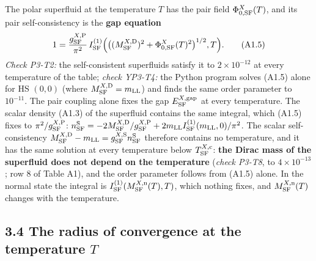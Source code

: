 \documentclass[
  10pt,
]{article}
\begin{document}
The polar superfluid at the temperature \(T\) has the pair field
\(\Phi^X_{0,{\rm SF}}(T)\), and its pair self-consistency is the
\textbf{gap equation}
\[1=\frac{g^{X,{\rm P}}_{\rm SF}}{\pi^2}\,I^{(1)}_{\rm SF}\Big(\big((M^{X,{\rm D}}_{\rm SF})^2+\Phi^X_{0,{\rm SF}}(T)^2\big)^{1/2},T\Big).\tag{A1.5}\]
\emph{Check P3-T2:} the self-consistent superfluids satisfy it to
\(2\times10^{-12}\) at every temperature of the table; \emph{check
YP3-T4:} the Python program solves (A1.5) alone for HS \((0,0)\) (where
\(M^{X,{\rm D}}_{\rm SF}=m_{\rm LL}\)) and finds the same order
parameter to \(10^{-11}\). The pair coupling alone fixes the gap
\(E^{X,{\rm gap}}_{\rm SF}\) at every temperature. The scalar density
(A1.3) of the superfluid contains the same integral, which (A1.5) fixes
to \(\pi^2/g^{X,{\rm P}}_{\rm SF}\):
\(n^{\rm S}_{\rm SF}=-2M^{X,{\rm D}}_{\rm SF}/g^{X,{\rm P}}_{\rm SF}+2m_{\rm LL}I^{(1)}_{\rm SF}(m_{\rm LL},0)/\pi^2\).
The scalar self-consistency
\(M^{X,{\rm D}}_{\rm SF}-m_{\rm LL}=g^{X,{\rm S}}_{\rm SF}n^{\rm S}_{\rm SF}\)
therefore contains no temperature, and it has the same solution at every
temperature below \(T^{X,{\rm c}}_{\rm SF}\): \textbf{the Dirac mass of
the superfluid does not depend on the temperature} (\emph{check P3-T8},
to \(4\times10^{-13}\); row 8 of Table A1), and the order parameter
follows from (A1.5) alone. In the normal state the integral is
\(I^{(1)}_{\rm SF}(M^{X,{\rm n}}_{\rm SF}(T),T)\), which nothing fixes,
and \(M^{X,{\rm n}}_{\rm SF}(T)\) changes with the temperature.

\hypertarget{the-radius-of-convergence-at-the-temperature-t}{%
\subsection{\texorpdfstring{3.4 The radius of convergence at the
temperature
\(T\)}{3.4 The radius of convergence at the temperature T}}\label{the-radius-of-convergence-at-the-temperature-t}}
\end{document}
